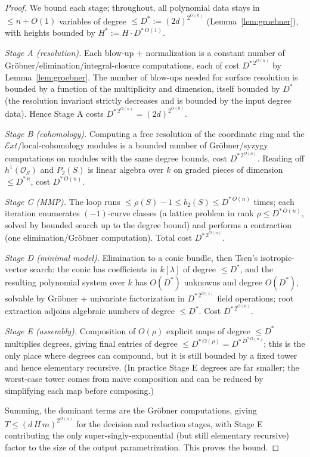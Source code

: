 \documentclass{amsart}
\theoremstyle{plain}
\theoremstyle{definition}
\newcommand{\cO}{\mathcal{O}}
\begin{document}
\begin{proof}
We bound each stage; throughout, all polynomial data stays in $\le n+O(1)$
variables of degree $\le D^*:=(2d)^{2^{O(n)}}$ (Lemma~\ref{lem:groebner}), with
heights bounded by $H^*:=H\cdot D^{*\,O(1)}$.

\emph{Stage A (resolution).}  Each blow-up + normalization is a constant number
of Gr\"obner/elimination/integral-closure computations, each of cost
$D^{*\,2^{O(n)}}$ by Lemma~\ref{lem:groebner}.  The number of blow-ups needed for
surface resolution is bounded by a function of the multiplicity and dimension,
itself bounded by $D^*$ (the resolution invariant strictly decreases and is
bounded by the input degree data).  Hence Stage A costs $D^{*\,2^{O(n)}}=
(2d)^{2^{O(n)}}$.

\emph{Stage B (cohomology).}  Computing a free resolution of the coordinate ring
and the $\mathcal{E}xt$/local-cohomology modules is a bounded number of
Gr\"obner/syzygy computations on modules with the same degree bounds, cost
$D^{*\,2^{O(n)}}$.  Reading off $h^1(\cO_S)$ and $P_2(S)$ is linear algebra over
$k$ on graded pieces of dimension $\le D^{*\,n}$, cost $D^{*\,O(n)}$.

\emph{Stage C (MMP).}  The loop runs $\le\rho(S)-1\le b_2(S)\le D^{*\,O(n)}$
times; each iteration enumerates $(-1)$-curve classes (a lattice problem in rank
$\rho\le D^{*\,O(n)}$, solved by bounded search up to the degree bound) and
performs a contraction (one elimination/Gr\"obner computation). Total cost
$D^{*\,2^{O(n)}}$.

\emph{Stage D (minimal model).}  Elimination to a conic bundle, then Tsen's
isotropic-vector search: the conic has coefficients in $k[\lambda]$ of degree
$\le D^*$, and the resulting polynomial system over $k$ has $O(D^*)$ unknowns and
degree $O(D^*)$, solvable by Gr\"obner + univariate factorization in
$D^{*\,2^{O(1)}}$ field operations; root extraction adjoins algebraic numbers of
degree $\le D^*$.  Cost $D^{*\,2^{O(n)}}$.

\emph{Stage E (assembly).}  Composition of $O(\rho)$ explicit maps of degree
$\le D^*$ multiplies degrees, giving final entries of degree $\le D^{*\,O(\rho)}=
D^{*\,D^{*\,O(n)}}$; this is the only place where degrees can compound, but it is
still bounded by a fixed tower and hence elementary recursive.  (In practice
Stage E degrees are far smaller; the worst-case tower comes from naive
composition and can be reduced by simplifying each map before composing.)

Summing, the dominant terms are the Gr\"obner computations, giving
$T\le(d\,H\,m)^{2^{O(n)}}$ for the decision and reduction stages, with Stage E
contributing the only super-singly-exponential (but still elementary recursive)
factor to the size of the output parametrization.  This proves the bound.
\end{proof}
\end{document}
